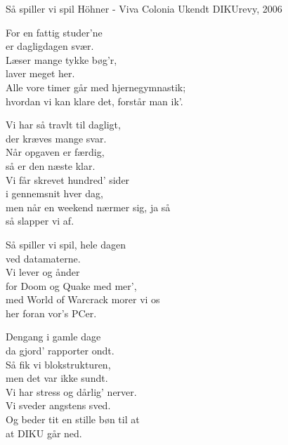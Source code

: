 \begin{song}{Så spiller vi spil}
  {} %
  {Höhner - Viva Colonia} %
  {Ukendt} %
  {DIKUrevy, 2006} %
  {\NotCCLIed} %
  
  \begin{SBVerse}
    For en fattig studer'ne \\
    er dagligdagen svær. \\
    Læser mange tykke bøg'r, \\
    laver meget her. \\
    Alle vore timer går med hjernegymnastik; \\
    hvordan vi kan klare det, forstår man ik'. \\
  \end{SBVerse}
    
  
  \begin{SBVerse} 
    Vi har så travlt til dagligt, \\
    der kræves mange svar. \\
    Når opgaven er færdig, \\
    så er den næste klar. \\
    Vi får skrevet hundred' sider \\
    i gennemsnit hver dag,\\
    men når en weekend nærmer sig, ja så \\
    så slapper vi af. \\
  \end{SBVerse}
  
  \begin{SBChorus}
    Så spiller vi spil, hele dagen \\
    ved datamaterne. \\
    Vi lever og ånder \\
    for Doom og Quake med mer', \\
    med World of Warcrack morer vi os \\
    her foran vor's PCer. \\
  \end{SBChorus}
  
  \begin{SBVerse}
    Dengang i gamle dage \\
    da gjord' rapporter ondt. \\
  Så fik vi blokstrukturen, \\
  men det var ikke sundt. \\
  Vi har stress og dårlig' nerver. \\
  Vi sveder angstens sved. \\
  Og beder tit en stille bøn til at \\
  at DIKU går ned. \\
\end{SBVerse}
  

\end{song}
